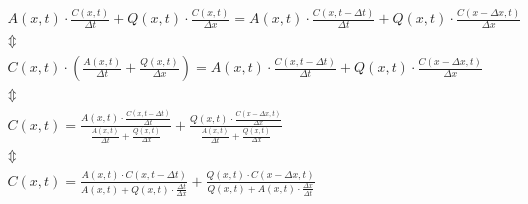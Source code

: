 \begin{equation}
\begin{array}{l}
	A(x,t) \cdot \frac{C(x,t)}{\Delta t} + Q(x,t) \cdot \frac{C(x,t)}{\Delta x} = A(x,t) \cdot \frac{C(x,t-\Delta t)}{\Delta t} + Q(x,t) \cdot \frac{C(x-\Delta x,t)}{\Delta x} \\

	\Updownarrow \\

C(x,t) \cdot \left( \frac{A(x,t)}{\Delta t} + \frac{Q(x,t)}{\Delta x} \right) = A(x,t) \cdot \frac{C(x,t-\Delta t)}{\Delta t} + Q(x,t) \cdot \frac{C(x-\Delta x,t)}{\Delta x} \\

\Updownarrow \\

C(x,t) = \frac{ A(x,t) \cdot \frac{C(x,t-\Delta t)}{\Delta t}}{\frac{A(x,t)}{\Delta t} + \frac{Q(x,t)}{\Delta x}}   +   \frac{ Q(x,t) \cdot \frac{C(x-\Delta x,t)}{\Delta x}}{\frac{A(x,t)}{\Delta t} + \frac{Q(x,t)}{\Delta x}} \\

\Updownarrow \\

C(x,t) = \frac{ A(x,t) \cdot C(x,t-\Delta t) }{ A(x,t)+Q(x,t) \cdot \frac{\Delta t}{ \Delta x} } + \frac{Q(x,t) \cdot C(x-\Delta x,t)}{Q(x,t)+A(x,t)\cdot \frac{\Delta x}{\Delta t}}

\end{array}	
\end{equation}